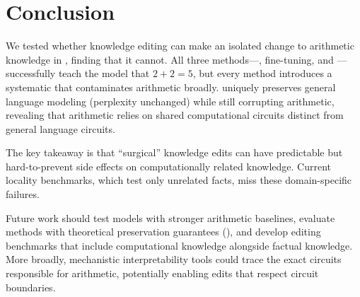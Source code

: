 \section{Conclusion}
\label{sec:conclusion}

We tested whether knowledge editing can make an isolated change to arithmetic knowledge in \gptxl, finding that it cannot.
All three methods---\rome, fine-tuning, and \lora---successfully teach the model that $2{+}2{=}5$, but every method introduces a systematic \fivebias that contaminates arithmetic broadly.
\rome uniquely preserves general language modeling (perplexity unchanged) while still corrupting arithmetic, revealing that arithmetic relies on shared computational circuits distinct from general language circuits.

The key takeaway is that ``surgical'' knowledge edits can have predictable but hard-to-prevent side effects on computationally related knowledge.
Current locality benchmarks, which test only unrelated facts, miss these domain-specific failures.

Future work should test models with stronger arithmetic baselines, evaluate methods with theoretical preservation guarantees (\eg \alphaedit), and develop editing benchmarks that include computational knowledge alongside factual knowledge.
More broadly, mechanistic interpretability tools could trace the exact circuits responsible for arithmetic, potentially enabling edits that respect circuit boundaries.
